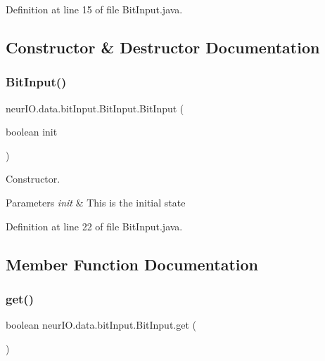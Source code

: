 Definition at line 15 of file Bit\+Input.\+java.



\subsection{Constructor \& Destructor Documentation}
\mbox{\label{classneur_i_o_1_1data_1_1bit_input_1_1_bit_input_a0cb3a5e6229418b6b2fa85184c855e32}} 
\subsubsection{\texorpdfstring{Bit\+Input()}{BitInput()}}
{\footnotesize\ttfamily neur\+I\+O.\+data.\+bit\+Input.\+Bit\+Input.\+Bit\+Input (\begin{DoxyParamCaption}\item[{boolean}]{init }\end{DoxyParamCaption})}

Constructor.


\begin{DoxyParams}{Parameters}
{\em init} & This is the initial state \\
\hline
\end{DoxyParams}


Definition at line 22 of file Bit\+Input.\+java.



\subsection{Member Function Documentation}
\mbox{\label{classneur_i_o_1_1data_1_1bit_input_1_1_bit_input_aba6bbd1b073178133b835343a45c722e}} 
\subsubsection{\texorpdfstring{get()}{get()}}
{\footnotesize\ttfamily boolean neur\+I\+O.\+data.\+bit\+Input.\+Bit\+Input.\+get (\begin{DoxyParamCaption}{ }\end{DoxyParamCaption})}

